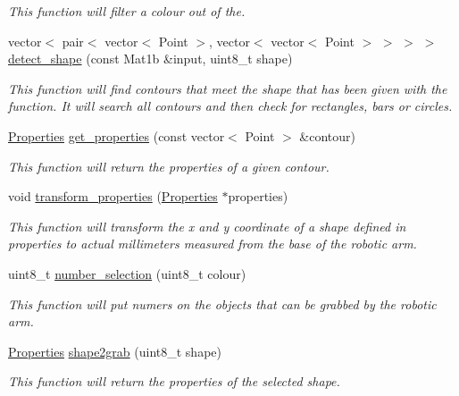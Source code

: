 \begin{DoxyCompactItemize}
\begin{DoxyCompactList}\small\item\em This function will filter a colour out of the. \end{DoxyCompactList}\item 
vector$<$ pair$<$ vector$<$ Point $>$, vector$<$ vector$<$ Point $>$ $>$ $>$ $>$ \hyperlink{class_vision_ac61f35fd2d78031d96986b8db8daf257}{detect\+\_\+shape} (const Mat1b \&input, uint8\+\_\+t shape)
\begin{DoxyCompactList}\small\item\em This function will find contours that meet the shape that has been given with the function. It will search all contours and then check for rectangles, bars or circles. \end{DoxyCompactList}\item 
\hyperlink{struct_properties}{Properties} \hyperlink{class_vision_a41e694aef79da35cad92f9e57ecdea4e}{get\+\_\+properties} (const vector$<$ Point $>$ \&contour)
\begin{DoxyCompactList}\small\item\em This function will return the properties of a given contour. \end{DoxyCompactList}\item 
void \hyperlink{class_vision_acd6cf5d0e7bba1adfb6f123d76489a6d}{transform\+\_\+properties} (\hyperlink{struct_properties}{Properties} $\ast$properties)
\begin{DoxyCompactList}\small\item\em This function will transform the x and y coordinate of a shape defined in properties to actual millimeters measured from the base of the robotic arm. \end{DoxyCompactList}\item 
uint8\+\_\+t \hyperlink{class_vision_a7c9c698f6da2af1773bd0b65ba4bfd34}{number\+\_\+selection} (uint8\+\_\+t colour)
\begin{DoxyCompactList}\small\item\em This function will put numers on the objects that can be grabbed by the robotic arm. \end{DoxyCompactList}\item 
\hyperlink{struct_properties}{Properties} \hyperlink{class_vision_a136b9affd9c8fdae0583b9a56d3817e4}{shape2grab} (uint8\+\_\+t shape)
\begin{DoxyCompactList}\small\item\em This function will return the properties of the selected shape. \end{DoxyCompactList}\end{DoxyCompactItemize}


